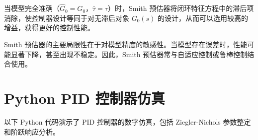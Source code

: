 当模型完全准确（$\hat{G}_0 = G_0$，$\hat{\tau} = \tau$）时，Smith 预估器将闭环特征方程中的滞后项消除，使控制器设计等同于对无滞后对象 $G_0(s)$ 的设计，从而可以选用较高的增益，获得更好的控制性能。

\begin{remark}
Smith 预估器的主要局限性在于对模型精度的敏感性。当模型存在误差时，性能可能显著下降，甚至出现不稳定。因此，Smith 预估器常与自适应控制或鲁棒控制结合使用。
\end{remark}

\section{Python PID 控制器仿真}

以下 Python 代码演示了 PID 控制器的数字仿真，包括 Ziegler-Nichols 参数整定和阶跃响应分析。

